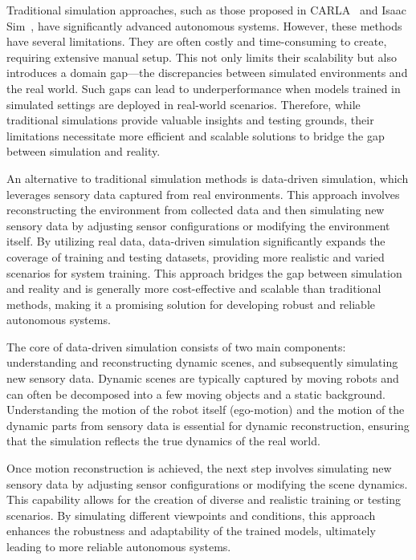 Traditional simulation approaches, such as those proposed in CARLA~\cite{dosovitskiy2017carla} and Isaac Sim~\cite{makoviychuk2021isaac}, have significantly advanced autonomous systems. However, these methods have several limitations. They are often costly and time-consuming to create, requiring extensive manual setup. This not only limits their scalability but also introduces a domain gap—the discrepancies between simulated environments and the real world. Such gaps can lead to underperformance when models trained in simulated settings are deployed in real-world scenarios. Therefore, while traditional simulations provide valuable insights and testing grounds, their limitations necessitate more efficient and scalable solutions to bridge the gap between simulation and reality.

An alternative to traditional simulation methods is data-driven simulation, which leverages sensory data captured from real environments. This approach involves reconstructing the environment from collected data and then simulating new sensory data by adjusting sensor configurations or modifying the environment itself. By utilizing real data, data-driven simulation significantly expands the coverage of training and testing datasets, providing more realistic and varied scenarios for system training. This approach bridges the gap between simulation and reality and is generally more cost-effective and scalable than traditional methods, making it a promising solution for developing robust and reliable autonomous systems.

The core of data-driven simulation consists of two main components: understanding and reconstructing dynamic scenes, and subsequently simulating new sensory data. Dynamic scenes are typically captured by moving robots and can often be decomposed into a few moving objects and a static background. Understanding the motion of the robot itself (ego-motion) and the motion of the dynamic parts from sensory data is essential for dynamic reconstruction, ensuring that the simulation reflects the true dynamics of the real world.

Once motion reconstruction is achieved, the next step involves simulating new sensory data by adjusting sensor configurations or modifying the scene dynamics. This capability allows for the creation of diverse and realistic training or testing scenarios. By simulating different viewpoints and conditions, this approach enhances the robustness and adaptability of the trained models, ultimately leading to more reliable autonomous systems.

